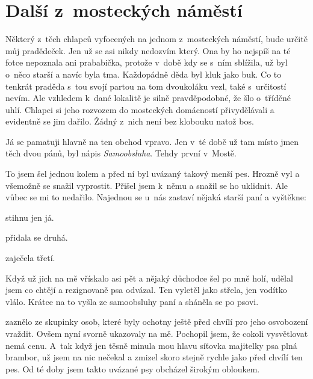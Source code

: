 
\chapter{Další z~mosteckých náměstí}

Některý z~těch chlapců vyfocených na jednom z~mosteckých náměstí, bude určitě
můj pradědeček. Jen už se asi nikdy nedozvím který. Ona by ho nejspíš na té
fotce nepoznala ani prababička, protože v~době kdy se s~ním sblížila, už byl
o~něco starší a navíc byla tma. Každopádně děda byl kluk jako buk. Co to
tenkrát praděda s~tou svojí partou na tom dvoukoláku vezl, také s~určitostí
nevím. Ale vzhledem k~dané lokalitě je silně pravděpodobné, že šlo o~tříděné
uhlí. Chlapci si jeho rozvozem do mosteckých domácností přivydělávali a
evidentně se jim dařilo. Žádný z~nich není bez klobouku natož bos.

Já se pamatuji hlavně na ten obchod vpravo. Jen v~té době už tam místo jmen
těch dvou pánů, byl nápis {\em Samoobsluha}. Tehdy první v~Mostě.

To jsem šel jednou kolem a před ní byl uvázaný takový menší pes. Hrozně vyl a
všemožně se snažil vyprostit. Přišel jsem k~němu a snažil se ho uklidnit. Ale
vůbec se mi to nedařilo. Najednou se u~nás zastaví nějaká starší paní a
vyštěkne: 

 stihnu jen já.

 přidala se
druhá.

 zaječela
třetí.

Když už jich na mě vřískalo asi pět a nějaký důchodce šel po mně holí, udělal
jsem co chtějí a rezignovaně psa odvázal. Ten vyletěl jako střela, jen vodítko
vlálo. Krátce na to vyšla ze samoobsluhy paní a sháněla se po psovi.

 zaznělo ze
skupinky osob, které byly ochotny ještě před chvílí pro jeho osvobození
vraždit. Ovšem nyní svorně ukazovaly na mě. Pochopil jsem, že cokoli
vysvětlovat nemá cenu. A~tak když jen těsně minula mou hlavu síťovka majitelky
psa plná brambor, už jsem na nic nečekal a zmizel skoro stejně rychle jako před
chvílí ten pes. Od té doby jsem takto uvázané psy obcházel širokým obloukem.

